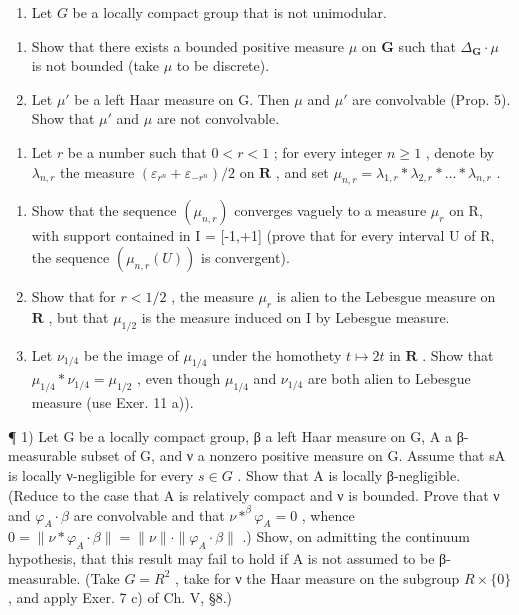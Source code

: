 \begin{enumerate}
\def\labelenumi{\arabic{enumi})}
\setcounter{enumi}{11}
\tightlist
\item
  Let \(G\) be a locally compact group that is not unimodular.
\end{enumerate}

\begin{enumerate}
\def\labelenumi{\alph{enumi})}
\item
  Show that there exists a bounded positive measure \(\mu\) on \(\mathbf{G}\) such that \(\Delta_{\mathbf{G}} \cdot \mu\) is not bounded (take \(\mu\) to be discrete).
\item
  Let \(\mu'\) be a left Haar measure on G. Then \(\mu\) and \(\mu'\) are convolvable (Prop. 5). Show that \(\mu'\) and \(\mu\) are not convolvable.
\end{enumerate}

\begin{enumerate}
\def\labelenumi{\arabic{enumi})}
\setcounter{enumi}{12}
\tightlist
\item
  Let \(r\) be a number such that \(0 < r < 1\) ; for every integer \(n \geqslant 1\) , denote by \(\lambda_{n,r}\) the measure \((\varepsilon_{r^n} + \varepsilon_{-r^n}) / 2\) on \(\mathbf{R}\) , and set \(\mu_{n,r} = \lambda_{1,r} * \lambda_{2,r} * \dots * \lambda_{n,r}\) .
\end{enumerate}

\begin{enumerate}
\def\labelenumi{\alph{enumi})}
\item
  Show that the sequence \((\mu_{n,r})\) converges vaguely to a measure \(\mu_{r}\) on R, with support contained in I = {[}-1,+1{]} (prove that for every interval U of R, the sequence \((\mu_{n,r}(U))\) is convergent).
\item
  Show that for \(r < 1/2\) , the measure \(\mu_r\) is alien to the Lebesgue measure on \(\mathbf{R}\) , but that \(\mu_{1/2}\) is the measure induced on I by Lebesgue measure.
\item
  Let \(\nu_{1/4}\) be the image of \(\mu_{1/4}\) under the homothety \(t \mapsto 2t\) in \(\mathbf{R}\) . Show that \(\mu_{1/4} * \nu_{1/4} = \mu_{1/2}\) , even though \(\mu_{1/4}\) and \(\nu_{1/4}\) are both alien to Lebesgue measure (use Exer. 11 a)).
\end{enumerate}

\exercisesection{}

¶ 1) Let G be a locally compact group, β a left Haar measure on G, A a β-measurable subset of G, and ν a nonzero positive measure on G. Assume that sA is locally ν-negligible for every \(s \in G\) . Show that A is locally β-negligible. (Reduce to the case that A is relatively compact and ν is bounded. Prove that ν and \(\varphi_{A} \cdot \beta\) are convolvable and that \(\nu *^{\beta} \varphi_{A} = 0\) , whence \(0 = \|\nu * \varphi_{A} \cdot \beta\| = \|\nu\| \cdot \|\varphi_{A} \cdot \beta\|\) .) Show, on admitting the continuum hypothesis, that this result may fail to hold if A is not assumed to be β-measurable. (Take \(G = R^{2}\) , take for ν the Haar measure on the subgroup \(R \times \{0\}\) , and apply Exer. 7 c) of Ch. V, §8.)

